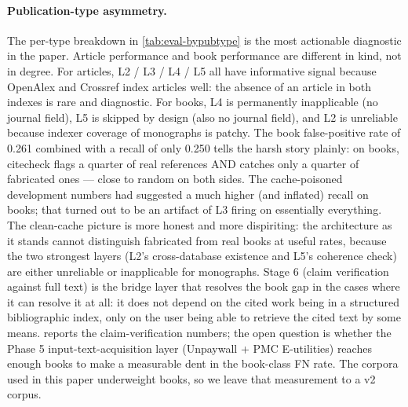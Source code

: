 \documentclass[12pt]{article}
\begin{document}
\paragraph{Publication-type asymmetry.} The per-type breakdown in \cref{tab:eval-bypubtype} is the most actionable diagnostic in the paper. Article performance and book performance are different in kind, not in degree. For articles, L2 / L3 / L4 / L5 all have informative signal because OpenAlex and Crossref index articles well: the absence of an article in both indexes is rare and diagnostic. For books, L4 is permanently inapplicable (no journal field), L5 is skipped by design (also no journal field), and L2 is unreliable because indexer coverage of monographs is patchy. The book false-positive rate of 0.261 combined with a recall of only 0.250 tells the harsh story plainly: on books, citecheck flags a quarter of real references AND catches only a quarter of fabricated ones --- close to random on both sides. The cache-poisoned development numbers had suggested a much higher (and inflated) recall on books; that turned out to be an artifact of L3 firing on essentially everything. The clean-cache picture is more honest and more dispiriting: the architecture as it stands cannot distinguish fabricated from real books at useful rates, because the two strongest layers (L2's cross-database existence and L5's coherence check) are either unreliable or inapplicable for monographs. Stage 6 (claim verification against full text) is the bridge layer that resolves the book gap in the cases where it can resolve it at all: it does not depend on the cited work being in a structured bibliographic index, only on the user being able to retrieve the cited text by some means.  reports the claim-verification numbers; the open question is whether the Phase 5 input-text-acquisition layer (Unpaywall + PMC E-utilities) reaches enough books to make a measurable dent in the book-class FN rate. The corpora used in this paper underweight books, so we leave that measurement to a v2 corpus.
\end{document}
